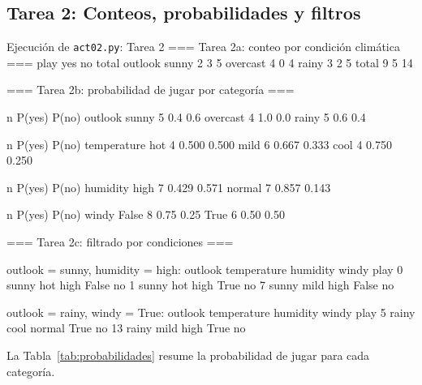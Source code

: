\documentclass[11pt,letterpaper]{article}
\begin{document}
\subsection{Tarea 2: Conteos, probabilidades y filtros}

\begin{consola}[label=out:tarea2]{Ejecución de \texttt{act02.py}: Tarea 2}
=== Tarea 2a: conteo por condición climática ===
play      yes  no  total
outlook
sunny       2   3      5
overcast    4   0      4
rainy       3   2      5
total       9   5     14

=== Tarea 2b: probabilidad de jugar por categoría ===

          n  P(yes)  P(no)
outlook
sunny     5     0.4    0.6
overcast  4     1.0    0.0
rainy     5     0.6    0.4

             n  P(yes)  P(no)
temperature
hot          4   0.500  0.500
mild         6   0.667  0.333
cool         4   0.750  0.250

          n  P(yes)  P(no)
humidity
high      7   0.429  0.571
normal    7   0.857  0.143

       n  P(yes)  P(no)
windy
False  8    0.75   0.25
True   6    0.50   0.50

=== Tarea 2c: filtrado por condiciones ===

outlook = sunny, humidity = high:
  outlook temperature humidity  windy play
0   sunny         hot     high  False   no
1   sunny         hot     high   True   no
7   sunny        mild     high  False   no

outlook = rainy, windy = True:
   outlook temperature humidity  windy play
5    rainy        cool   normal   True   no
13   rainy        mild     high   True   no
\end{consola}

La Tabla~\ref{tab:probabilidades} resume la probabilidad de jugar para cada categoría.
\end{document}
